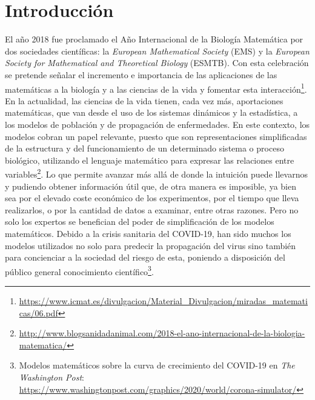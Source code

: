 \chapter{Introducción}
\label{cap:introduccion}


El año 2018 fue proclamado el Año Internacional de la Biología Matemática por dos sociedades científicas: la \textit{European Mathematical Society} (EMS) y la \textit{European Society for Mathematical and Theoretical Biology} (ESMTB). Con esta celebración se pretende señalar el incremento e importancia de las aplicaciones de las matemáticas a la biología y a las ciencias de la vida y fomentar esta interacción\footnote{\url{https://www.icmat.es/divulgacion/Material_Divulgacion/miradas_matematicas/06.pdf}}. En la actualidad, las ciencias de la vida tienen, cada vez más, aportaciones matemáticas, que van desde el uso de los sistemas dinámicos y la estadística, a los modelos de población y de propagación de enfermedades. En este contexto, los modelos cobran un papel relevante, puesto que son representaciones simplificadas de la estructura y del funcionamiento de un determinado sistema o proceso biológico, utilizando el lenguaje matemático para expresar las relaciones entre variables\footnote{\url{http://www.blogsanidadanimal.com/2018-el-ano-internacional-de-la-biologia-matematica/}}. Lo que permite avanzar más allá de donde la intuición puede llevarnos y pudiendo obtener información útil que, de otra manera es imposible, ya bien sea por el elevado coste económico de los experimentos, por el tiempo que lleva realizarlos, o por la cantidad de datos a examinar, entre otras razones. Pero no solo los expertos se benefician del poder de simplificación de los modelos matemáticos. Debido a la crisis sanitaria del COVID-19, han sido muchos los modelos utilizados no solo para predecir la propagación del virus sino también para concienciar a la sociedad del riesgo de esta, poniendo a disposición del público general conocimiento científico\footnote{Modelos matemáticos sobre la curva de crecimiento del COVID-19 en \textit{The Washington Post}: \url{https://www.washingtonpost.com/graphics/2020/world/corona-simulator/}}. 


